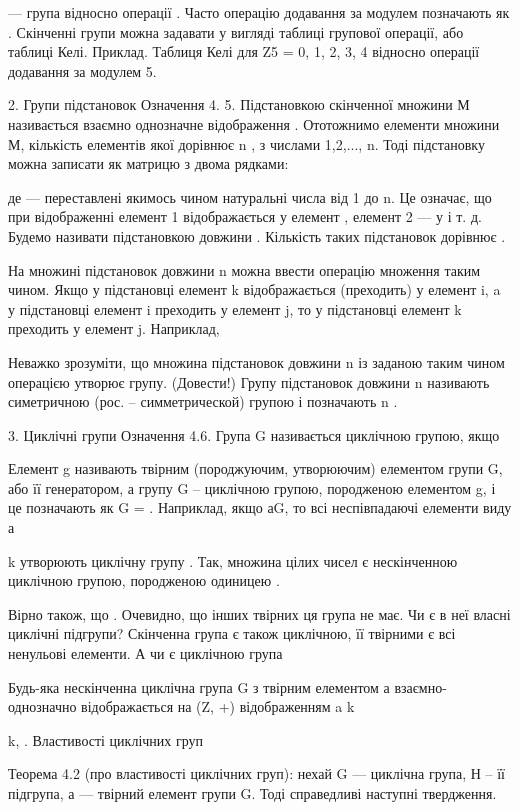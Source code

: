 --- група відносно операції .
Часто операцію додавання за модулем позначають як .
Скінченні групи можна задавати у вигляді таблиці групової
операції, або таблиці Келі.
Приклад. Таблиця Келі для Z5 = {0, 1, 2, 3, 4} відносно операції
додавання за модулем 5.


2. Групи підстановок
 Означення 4. 5. Підстановкою скінченної множини М
називається взаємно однозначне відображення .
Ототожнимо елементи множини М, кількість елементів якої
дорівнює n , з числами 1,2,..., n. Тоді підстановку можна
записати як матрицю з двома рядками:

де --- переставлені якимось чином
натуральні числа від 1 до n. Це означає, що при відображенні
елемент 1 відображається у елемент , елемент 2 --- у  і т. д.
Будемо називати підстановкою довжини . Кількість таких
підстановок дорівнює .

На множині підстановок довжини n можна ввести операцію
множення таким чином. Якщо у підстановці елемент k
відображається (преходить) у елемент i, a у підстановці елемент
i преходить у елемент j, то у підстановці елемент k
преходить у елемент j. Наприклад,

Неважко зрозуміти, що множина підстановок довжини n із
заданою таким чином операцією утворює групу. (Довести!)
Групу підстановок довжини n називають симетричною (рос. –
симметрической) групою і позначають n .

3. Циклічні групи
Означення 4.6. Група G називається циклічною групою, якщо

Елемент g називають твірним (породжуючим, утворюючим)
елементом групи G, або її генератором, а групу G – циклічною
групою, породженою елементом g, і це позначають як G = .
 Наприклад, якщо аG, то всі неспівпадаючі елементи виду а

k  утворюють циклічну групу . Так, множина цілих чисел
є нескінченною циклічною групою, породженою одиницею .

Вірно також, що   . Очевидно, що інших твірних ця
група не має. Чи є в неї власні циклічні підгрупи? Скінченна група
є також циклічною, її твірними є всі ненульові
елементи. А чи є циклічною група  

Будь-яка нескінченна циклічна група G з твірним елементом а
взаємно-однозначно відображається на (Z, +) відображенням a
k

k,
.
Властивості циклічних груп

Теорема 4.2 (про властивості циклічних груп): нехай G ---
циклічна група, Н – її підгрупа, а --- твірний елемент групи G. Тоді
справедливі наступні твердження.

